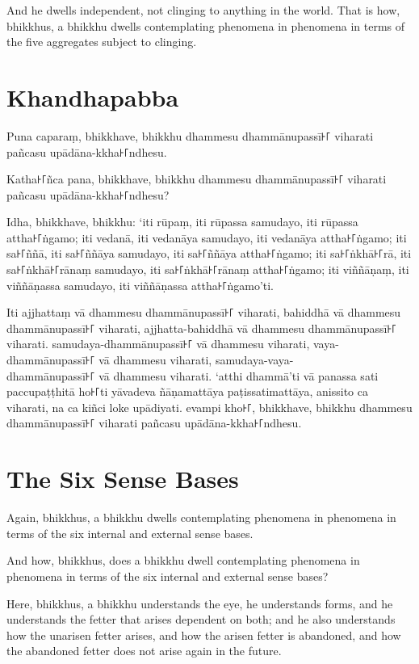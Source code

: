 And he dwells independent, not clinging to anything in the world. That is how,
bhikkhus, a bhikkhu dwells contemplating phenomena in phenomena in terms of the
five aggregates subject to clinging.


\paliPage
\section*{Khandhapabba}

Puna caparaṃ, bhikkhave, bhikkhu dhammesu dhammānupassī꜔꜒ viharati pañcasu
upādāna-kkha꜔꜒ndhesu.

Katha꜔꜒ñca pana, bhikkhave, bhikkhu dhammesu dhammānupassī꜔꜒ viharati pañcasu
upādāna-kkha꜔꜒ndhesu?

Idha, bhikkhave, bhikkhu:
‘iti rūpaṃ, iti rūpassa samudayo, iti rūpassa attha꜔꜒ṅgamo;
iti vedanā, iti vedanāya samudayo, iti vedanāya attha꜔꜒ṅgamo;
iti sa꜔꜒ññā, iti sa꜔꜒ññāya samudayo, iti sa꜔꜒ññāya attha꜔꜒ṅgamo;
iti sa꜔꜒ṅkhā꜔꜒rā, iti sa꜔꜒ṅkhā꜔꜒rānaṃ samudayo, iti sa꜔꜒ṅkhā꜔꜒rānaṃ attha꜔꜒ṅgamo;
iti viññāṇaṃ, iti viññāṇassa samudayo, iti viññāṇassa attha꜔꜒ṅgamo’ti.

Iti ajjhattaṃ vā dhammesu dhammānupassī꜔꜒ viharati,
bahiddhā vā dhammesu dhammānupassī꜔꜒ viharati,
ajjhatta-bahiddhā vā dhammesu dhammānupassī꜔꜒ viharati.
samudaya-dhammānupassī꜔꜒ vā dhammesu viharati,
vaya-dhammānupassī꜔꜒ vā dhammesu viharati,
samudaya-vaya-\\ dhammānupassī꜔꜒ vā dhammesu viharati.
‘atthi dhammā’ti vā panassa sati paccupaṭṭhitā ho꜔꜒ti
yāvadeva ñāṇamattāya paṭissatimattāya, anissito ca viharati,
na ca kiñci loke upādiyati. evampi kho꜔꜒, bhikkhave, bhikkhu
dhammesu dhammānupassī꜔꜒ viharati pañcasu upādāna-kkha꜔꜒ndhesu.


\englishPage
\section{The Six Sense Bases}

Again, bhikkhus, a bhikkhu dwells contemplating phenomena in phenomena in terms
of the six internal and external sense bases.

And how, bhikkhus, does a bhikkhu dwell contemplating phenomena in phenomena in
terms of the six internal and external sense bases?

Here, bhikkhus, a bhikkhu understands the eye, he understands forms, and he
understands the fetter that arises dependent on both; and he also understands
how the unarisen fetter arises, and how the arisen fetter is abandoned, and how
the abandoned fetter does not arise again in the future.

